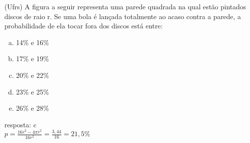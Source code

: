 \begin{ex}
(Ufrs) A figura a seguir representa uma parede quadrada na qual estão pintados discos de raio r. Se uma bola é lançada totalmente ao acaso contra a parede, a probabilidade de ela tocar fora dos discos está entre:
\begin{center}
\end{center}
   \begin{enumerate}[(a)]
   \item 14\% e 16\%
   \item 17\% e 19\%
   \item 20\% e 22\%
   \item 23\% e 25\%
   \item 26\% e 28\%
   \end{enumerate}
    \begin{sol}
     resposta: c \\
     $p=\frac{16r^2-4\pi r^2}{16r^2}=\frac{3,44}{16}=21,5\%$
    \end{sol}
\end{ex}